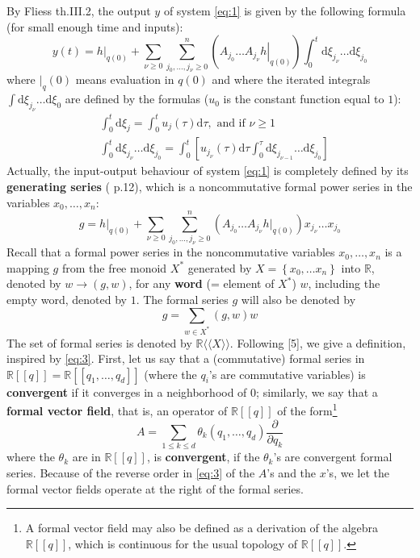 \documentclass[a4paper,12pt]{article}
\newcommand{\R}{\mathbb{R}}
\newcommand{\Rxx}{\R\langle\langle X\rangle\rangle}
\newcommand{\dd}{\mathrm{d}}
\begin{document}
By Fliess \cite{4} th.III.2, the output $y$ of system \eqref{eq:1} is given by the following formula (for small enough time and inputs):
\begin{equation} \label{eq:2}
	y(t)=\left.h\right|_{q(0)}+\sum_{\nu \geq 0} \sum_{j_0, \ldots, j_\nu \geq 0}^n\left(\left.A_{j_0} \ldots A_{j_\nu} h\right|_{q(0)}\right) \int_0^t \dd \xi_{j_\nu} \ldots \dd \xi_{j_0}
\end{equation}
where $\rvert_q(0)$ means evaluation in $q(0)$ and where the iterated integrals $\int \dd \xi_{j_\nu} \ldots \dd \xi_0$ are defined by the formulas ($u_0$ is the constant function equal to $1$):
\begin{equation*}
	\begin{aligned}
		& \int_0^t \dd \xi_j=\int_0^t u_j(\tau) \dd \tau, \text { and if } \nu \geq 1 \\
		& \int_0^t \dd \xi_{j_\nu} \ldots \dd \xi_{j_0}=\int_0^t\left[u_{j_\nu}(\tau) \dd  \tau \int_0^\tau \dd \xi_{j_{\nu-1}} \ldots \dd  \xi_{j_0}\right]
	\end{aligned}
\end{equation*}
Actually, the input-output behaviour of system \eqref{eq:1} is completely defined by its \textbf{generating series} (\cite{4} p.12), which is a noncommutative formal power series in the variables $x_0, \ldots, x_n$:
\begin{equation} \label{eq:3}
	{g}=\left.{h}\right|_{{q}(0)}+\sum_{\nu \geq 0} \sum_{j_0, \ldots, j_\nu \geq 0}^{{n}}\left({A}_{j_0} \ldots {A}_{j_\nu} {h}\rvert_{{q}(0)}\right) {x}_{{j}_\nu} \ldots {x}_{j_0}
\end{equation}
Recall that a formal power series in the noncommutative variables ${x}_0, \ldots, {x}_{{n}}$ is a mapping ${g}$ from the free monoid $X^*$ generated by ${X}=\left\{{x}_0, \ldots x_n\right\}$ into $\R$, denoted by ${w} \rightarrow({g}, {w})$, for any \textbf{word} (= element of $X^*$) ${w}$, including the empty word, denoted by $1$. The formal series $g$ will also be denoted by
\begin{equation*}
	g=\sum_{w \in {X}^*}(g, {w}) {w}
\end{equation*}
The set of formal series is denoted by $\Rxx$. Following [5], we give a definition, inspired by \eqref{eq:3}. First, let us say that a (commutative) formal series in $\R[[q]]=\R[[q_1, \ldots, q_d]]$ (where the $q_i$'s are commutative variables) is \textbf{convergent} if it converges in a neighborhood of $0$; similarly, we say that a \textbf{formal vector field}, that is, an operator of $\R[[q]]$ of the form\footnote{A formal vector field may also be defined as a derivation of the algebra $\R[[q]]$, which is continuous for the usual topology of $\R[[q]]$.}
\begin{equation*}
	A=\sum_{1 \leq k \leq d} \theta_k\left(q_1, \ldots, q_d\right) \frac{\partial}{\partial q_k}
\end{equation*}
where the $\theta_{{k}}$ are in $\R[[{q}]]$, is \textbf{convergent}, if the $\theta_{k}$'s are convergent formal series. Because of the reverse order in \eqref{eq:3} of the $A$'s and the $x$'s, we let the formal vector fields operate at the right of the formal series.
\end{document}
